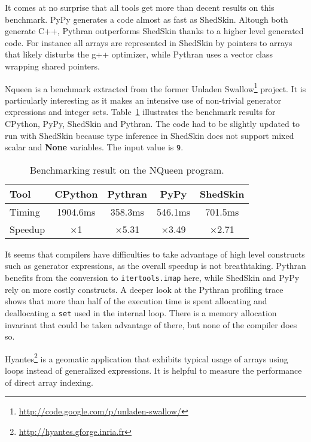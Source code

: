 \documentclass[10pt, onecolumn, preprint]{sigplanconf}
\begin{document}
It comes at no surprise that all tools get more than decent results on this
benchmark. PyPy generates a code almost as fast %
as ShedSkin. Altough both
generate C++, Pythran outperforms ShedSkin thanks to a higher level generated
code. For instance all arrays are represented in ShedSkin by pointers to arrays
that likely disturbs the g++ optimizer, while Pythran uses a vector class wrapping
shared pointers.

Nqueen is a benchmark extracted from the former Unladen Swallow\footnote{\url{http://code.google.com/p/unladen-swallow/}} project. It
is particularly interesting as it makes an intensive use of non-trivial
generator expressions and integer sets. Table~\ref{tbl:nqueen} illustrates
the benchmark results for CPython, PyPy, ShedSkin and Pythran. The code had to
be slightly updated to run with ShedSkin because type inference in ShedSkin does
not support mixed scalar and \textbf{None} variables. The input value is \texttt{9}.

\begin{table}
    \centering

    \begin{tabular}{|l|c|c|c|c|}
        \hline
     Tool    &  CPython    &   Pythran     &     PyPy   &  ShedSkin \\
    \hline
     Timing  &  1904.6ms   &   358.3ms     &    546.1ms &  701.5ms  \\
    \hline
     Speedup &  $\times$1         &    $\times$5.31      &    $\times$3.49   &  $\times$2.71    \\
    \hline
\end{tabular}
\caption{Benchmarking result on the NQueen program.}
\label{tbl:nqueen}

\end{table}

It seems that compilers have difficulties to take advantage of high level
constructs such as generator expressions, as the overall speedup is not
breathtaking. Pythran benefits from the conversion to \texttt{itertools.imap} here,
while ShedSkin and PyPy rely on more costly constructs. A deeper look at the
Pythran profiling trace shows that more than half of the execution time is
spent allocating and deallocating a \texttt{set} used in the internal loop. There is a
memory allocation invariant that could be taken advantage of there, but none of
the compiler does so.

Hyantes\footnote{\url{http://hyantes.gforge.inria.fr}} is a geomatic application that exhibits typical usage of arrays
using loops instead of generalized expressions. It is helpful to measure the
performance of direct array indexing.
\end{document}
